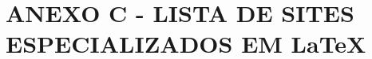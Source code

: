 \renewcommand{\thechapter}{}%
\chapter{ANEXO C - LISTA DE SITES ESPECIALIZADOS EM \LaTeX{}} %
\label{anexoC} %
\renewcommand{\thechapter}{C}%